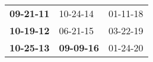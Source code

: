 \begin{supertabular}{p{0.33\columnwidth}p{0.33\columnwidth}p{0.33\columnwidth}}
 \textbf{09-21-11\textsuperscript{}} &           10-24-14\textsuperscript{} &  01-11-18\textsuperscript{} \\
 \textbf{10-19-12\textsuperscript{}} &           06-21-15\textsuperscript{} &  03-22-19\textsuperscript{} \\
 \textbf{10-25-13\textsuperscript{}} &  \textbf{09-09-16\textsuperscript{}} &  01-24-20\textsuperscript{} \\
\end{supertabular}
